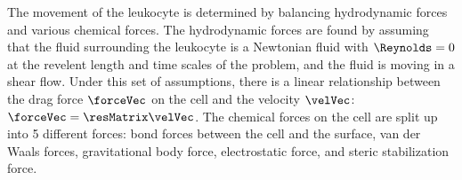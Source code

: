The movement of the leukocyte is determined by balancing hydrodynamic
forces and various chemical forces. The hydrodynamic forces are found
by assuming that the fluid surrounding the leukocyte is a Newtonian
fluid with $\Reynolds = 0$ at the revelent length and time scales of
the problem, and the fluid is moving in a shear flow. Under this set
of assumptions, there is a linear relationship between the drag force
$\forceVec$ on the cell and the velocity $\velVec$: $\forceVec =
\resMatrix \velVec$. The chemical forces on the cell are split up into
5 different forces: bond forces between the cell and the surface, van
der Waals forces, gravitational body force, electrostatic force, and
steric stabilization force.
